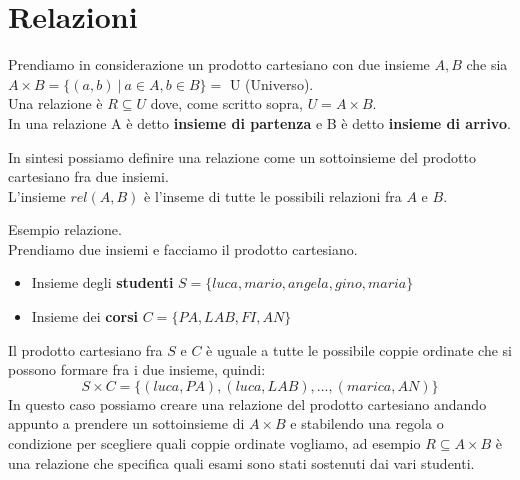 \section{Relazioni}
\begin{definition}[Relazione]
	\label{def:relazione}
	Prendiamo in considerazione un prodotto cartesiano con due insieme $A, B$ che sia $A \times B = \{(a,b) \: | \: a \in A, b \in B\} = $ U (Universo). 
	\\
	Una relazione è $R \subseteq U$ dove, come scritto sopra, $U = A \times B$.
	\\
	In una relazione A è detto \textbf{insieme di partenza} e B è detto \textbf{insieme di arrivo}.
\end{definition}

\hspace{-15pt}
In sintesi possiamo definire una relazione come un sottoinsieme del prodotto cartesiano fra due insiemi.
\\
L'insieme $rel(A,B)$ è l'inseme di tutte le possibili relazioni fra $A$ e $B$.
\begin{example}
    Esempio relazione.\\
    Prendiamo due insiemi e facciamo il prodotto cartesiano.
    \begin{itemize}
    	\item Insieme degli \textbf{studenti} $S = \{luca, mario, angela, gino, maria\}$
    	\item Insieme dei \textbf{corsi} $C = \{PA, LAB, FI, AN\}$
    \end{itemize}
    Il prodotto cartesiano fra $S$ e $C$ è uguale a tutte le possibile coppie ordinate che si possono formare fra i due insieme, quindi:
    \begin{equation}
    	S \times C = \{(luca, PA), (luca, LAB), ..., (marica, AN)\}
    \end{equation}
    In questo caso possiamo creare una relazione del prodotto cartesiano andando appunto a prendere un sottoinsieme di $A \times B$ e stabilendo una regola o condizione per scegliere quali coppie ordinate vogliamo, ad esempio $R \subseteq A \times B$ è una relazione che specifica quali esami sono stati sostenuti dai vari studenti.
\end{example}

